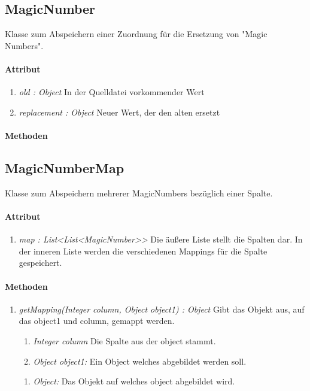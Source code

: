 \subsection{MagicNumber}
Klasse zum Abspeichern einer Zuordnung für die Ersetzung von \string"Magic Numbers\string".

\paragraph{Attribut}
\begin{enumerate}[-]
\item \textit{old : Object} In der Quelldatei vorkommender Wert
\item \textit{replacement : Object} Neuer Wert, der den alten ersetzt
\end{enumerate}
\paragraph{Methoden}

\subsection{MagicNumberMap}
Klasse zum Abspeichern mehrerer MagicNumbers bezüglich einer Spalte.

\paragraph{Attribut}
\begin{enumerate}[-]
	\item \textit{map : List<List<MagicNumber>{}>} Die äußere Liste stellt die Spalten dar. In der inneren Liste werden die verschiedenen Mappings für die Spalte gespeichert.
\end{enumerate}

\paragraph{Methoden}
\begin{enumerate}[+]
	\item \textit{getMapping(Integer column, Object object1) : Object} Gibt das Objekt aus, auf das object1 und column, gemappt werden.
	
	\begin{enumerate}[$\bullet$]
		\item \textit{Integer column} Die Spalte aus der object stammt.
		\item \textit{Object object1:} Ein Object welches abgebildet werden soll.
	\end{enumerate}
	\vspace{-0.2cm}
	\begin{enumerate}[$\circ$]
		\item \textit{Object:} Das Objekt auf welches object abgebildet wird.
	\end{enumerate}
\end{enumerate}